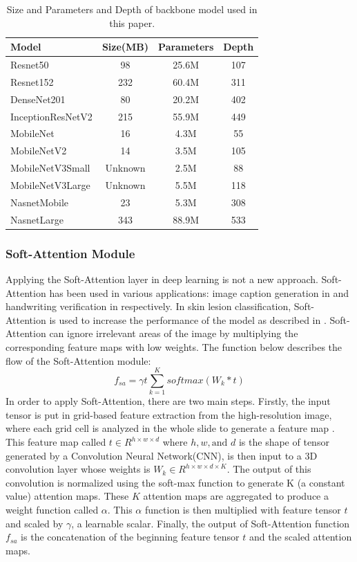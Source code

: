 \documentclass[sensors,article,submit,pdftex,moreauthors]{Definitions/mdpi}
\begin{document}
\begin{table}[H]
	\centering
	\begin{tabular}{|l | c c c|} 
		\hline
		Model & Size(MB) & Parameters & Depth \\ 
		\hline
		Resnet50 & 98 & 25.6M & 107 \\ 
		\hline
		Resnet152 & 232 & 60.4M & 311 \\ 
		\hline
		DenseNet201 & 80 & 20.2M & 402 \\
		\hline
		InceptionResNetV2 & 215 & 55.9M & 449 \\
		\hline
		MobileNet & 16 & 4.3M & 55 \\ 
		\hline
		MobileNetV2 & 14 & 3.5M & 105 \\ 
		\hline
		MobileNetV3Small & Unknown & 2.5M & 88 \\ 
		\hline
		MobileNetV3Large & Unknown & 5.5M & 118 \\
		\hline
		NasnetMobile & 23 & 5.3M & 308 \\
		\hline
		NasnetLarge & 343 & 88.9M & 533 \\ 
		\hline
	\end{tabular}
	\caption{Size and Parameters and Depth of backbone model used in this paper.}
	\label{table:model-summary}
\end{table}

\subsubsection{Soft-Attention Module}
Applying the Soft-Attention layer in deep learning is not a new approach. Soft-Attention has been used in various applications: image caption generation in \cite{03044} and handwriting verification in \cite{202017} respectively. In skin lesion classification, Soft-Attention is used to increase the performance of the model as described in \cite{03358}. Soft-Attention can ignore irrelevant areas of the image by multiplying the corresponding feature maps with low weights. The function below describes the flow of the Soft-Attention module:
\[
f_{sa} = \gamma t\sum_{k=1}^{K}softmax(W_k * t)
\]
In order to apply Soft-Attention, there are two main steps. Firstly, the input tensor is put in grid-based feature extraction from the high-resolution image, where each grid cell is analyzed in the whole slide to generate a feature map \cite{08513}. This feature map called $t \in R^{h \times w \times d}$ where $h, w, \text{and } d$ is the shape of tensor generated by a Convolution Neural Network(CNN), is then input to a 3D convolution layer whose weights is $W_k \in R^{h \times w \times d \times K}$. The output of this convolution is normalized using the soft-max function to generate K (a constant value) attention maps. These $K$ attention maps are aggregated to produce a weight function called $\alpha$. This $\alpha$ function is then multiplied with feature tensor $t$ and scaled by $\gamma$, a learnable scalar. Finally, the output of Soft-Attention function $f_{sa}$ is the concatenation of the beginning feature tensor $t$ and the scaled attention maps. 
\end{document}
